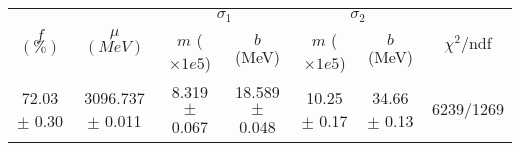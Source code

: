\begin{tabular}{c|c|cc|cc||c}
 \multirow{2}{*}{$f$ $(\%)$} & \multirow{2}{*}{$\mu$ $(MeV)$} & \multicolumn{2}{|c|}{$\sigma_1$} & \multicolumn{2}{|c||}{$\sigma_2$} & \multirow{2}{*}{$\chi^2/$ndf} \\
 & & $m$ ($\times1e5$) & $b$ (MeV) & $m$ ($\times1e5$) & $b$ (MeV) & \\
\hline
72.03 $\pm$ 0.30 & 3096.737 $\pm$ 0.011 & 8.319 $\pm$ 0.067 & 18.589 $\pm$ 0.048 & 10.25 $\pm$ 0.17 & 34.66 $\pm$ 0.13 & 6239/1269\\
\end{tabular}
